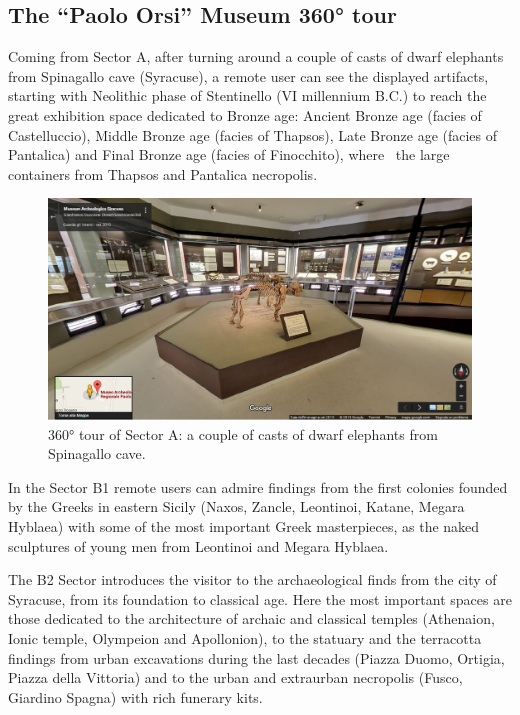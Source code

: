 \documentclass[amsthm,ebook]{saparticle}
\begin{document}
\subsection{The ``Paolo Orsi'' Museum 360° tour}


\noindent Coming from Sector A, after turning around a couple of casts of dwarf elephants from Spinagallo cave (Syracuse), a
remote user can see the displayed artifacts, starting with Neolithic phase of Stentinello (VI millennium B.C.) to reach
the great exhibition space dedicated to Bronze age: Ancient Bronze age (facies of Castelluccio), Middle Bronze age
(facies of Thapsos), Late Bronze age (facies of Pantalica) and Final Bronze age (facies of Finocchito), where \ the
large containers from Thapsos and Pantalica necropolis.

\begin{figure}[!bp]
\centering
 \includegraphics[width=\columnwidth]{EAGLE2016BONACINIPilotprojectatPaoloOrsiMuseum-img002.jpg}
\caption{360° tour of Sector A: a couple of casts of dwarf elephants from Spinagallo cave. }
\label{fig:2}
\end{figure}


In the Sector B1 remote users can admire findings from the first colonies founded by the Greeks in eastern Sicily
(Naxos, Zancle, Leontinoi, Katane, Megara Hyblaea) with some of the most important Greek masterpieces, as the naked
sculptures of young men from Leontinoi and Megara Hyblaea.

The B2 Sector introduces the visitor to the archaeological finds from the city of Syracuse, from its foundation to
classical age. Here the most important spaces are those dedicated to the architecture of archaic and classical temples
(Athenaion, Ionic temple, Olympeion and Apollonion), to the statuary and the terracotta findings from urban excavations
during the last decades (Piazza Duomo, Ortigia, Piazza della Vittoria) and to the urban and extraurban necropolis
(Fusco, Giardino Spagna) with rich funerary kits. \ 
\end{document}
